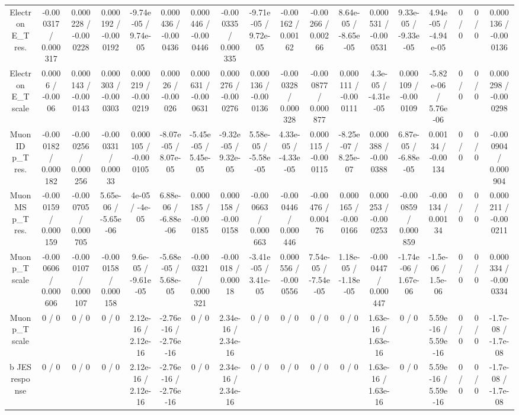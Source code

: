 \documentclass[10pt]{article}
\begin{document}
\begin{table}[htbp]
\begin{center}
\begin{tabular}{|c|c|c|c|c|c|c|c|c|c|c|c|c|c|c|c|c|c|}
  Electron E_{T} res. & -0.000317 / 0.000317 & 0.000228 / -0.000228 & 0.000192 / -0.000192 & -9.74e-05 / 9.74e-05 & 0.000436 / -0.000436 & 0.000446 / -0.000446 & -0.000335 / 0.000335 & -9.71e-05 / 9.72e-05 & -0.00162 / 0.00162 & -0.00266 / 0.00266 & 8.64e-05 / -8.65e-05 & 0.000531 / -0.000531 & 9.33e-05 / -9.33e-05 & 4.94e-05 / -4.94e-05 & 0 / 0 & 0 / 0 & 0.000136 / -0.000136 \\ 
  Electron E_{T} scale & 0.0006 / -0.0006 & 0.000143 / -0.000143 & 0.000303 / -0.000303 & 0.000219 / -0.000219 & 0.00026 / -0.00026 & 0.000631 / -0.000631 & 0.000276 / -0.000276 & 0.000136 / -0.000136 & -0.000328 / 0.000328 & -0.000877 / 0.000877 & 0.000111 / -0.000111 & 4.3e-05 / -4.31e-05 & 0.000109 / -0.000109 & -5.82e-06 / 5.76e-06 & 0 / 0 & 0 / 0 & 0.000298 / -0.000298 \\ 
  Muon ID p_{T} res. & -0.000182 / 0.000182 & -0.000256 / 0.000256 & -0.000331 / 0.00033 & 0.000105 / -0.000105 & -8.07e-05 / 8.07e-05 & -5.45e-05 / 5.45e-05 & -9.32e-05 / 9.32e-05 & 5.58e-05 / -5.58e-05 & 4.33e-05 / -4.33e-05 & 0.000115 / -0.000115 & -8.25e-07 / 8.25e-07 & 0.000388 / -0.000388 & 6.87e-05 / -6.88e-05 & 0.00134 / -0.00134 & 0 / 0 & 0 / 0 & -0.000904 / 0.000904 \\ 
  Muon MS p_{T} res. & -0.000159 / 0.000159 & -0.000705 / 0.000705 & 5.65e-06 / -5.65e-06 & 4e-05 / -4e-05 & 6.88e-06 / -6.88e-06 & 0.000185 / -0.000185 & 0.000158 / -0.000158 & -0.000663 / 0.000663 & -0.000446 / 0.000446 & -0.00476 / 0.00476 & 0.000165 / -0.000166 & 0.000253 / -0.000253 & -0.000859 / 0.000859 & -0.00134 / 0.00134 & 0 / 0 & 0 / 0 & 0.000211 / -0.000211 \\ 
  Muon p_{T} scale & -0.000606 / 0.000606 & -0.000107 / 0.000107 & -0.000158 / 0.000158 & 9.6e-05 / -9.61e-05 & -5.68e-05 / 5.68e-05 & -0.000321 / 0.000321 & -0.00018 / 0.00018 & -3.41e-05 / 3.41e-05 & 0.000556 / -0.000556 & 7.54e-05 / -7.54e-05 & 1.18e-05 / -1.18e-05 & -0.000447 / 0.000447 & -1.74e-06 / 1.67e-06 & -1.5e-06 / 1.5e-06 & 0 / 0 & 0 / 0 & 0.000334 / -0.000334 \\ 
  Muon p_{T} scale & 0 / 0 & 0 / 0 & 0 / 0 & 2.12e-16 / 2.12e-16 & -2.76e-16 / -2.76e-16 & 0 / 0 & 2.34e-16 / 2.34e-16 & 0 / 0 & 0 / 0 & 0 / 0 & 0 / 0 & 1.63e-16 / 1.63e-16 & 0 / 0 & 5.59e-16 / 5.59e-16 & 0 / 0 & 0 / 0 & -1.7e-08 / -1.7e-08 \\ 
  b JES response & 0 / 0 & 0 / 0 & 0 / 0 & 2.12e-16 / 2.12e-16 & -2.76e-16 / -2.76e-16 & 0 / 0 & 2.34e-16 / 2.34e-16 & 0 / 0 & 0 / 0 & 0 / 0 & 0 / 0 & 1.63e-16 / 1.63e-16 & 0 / 0 & 5.59e-16 / 5.59e-16 & 0 / 0 & 0 / 0 & -1.7e-08 / -1.7e-08 \\ 

\end{tabular}
\end{center}
\end{table}
\end{document}
